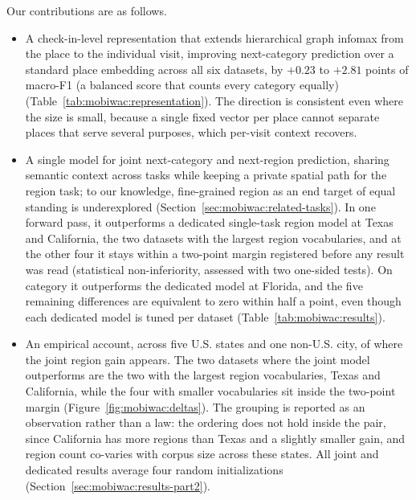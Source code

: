 Our contributions are as follows.
\begin{itemize}
  \item A check-in-level representation that extends hierarchical graph infomax from the place to the individual visit, improving next-category prediction over a standard place embedding across all six datasets, by $+0.23$ to $+2.81$ points of macro-F1 (a balanced score that counts every
    category equally) (Table~\ref{tab:mobiwac:representation}). The direction is
    consistent even where the size is small, because a single fixed vector
    per place cannot separate places that serve several purposes, which
    per-visit context recovers.
  \item A single model for joint next-category and next-region prediction, sharing semantic context across tasks while keeping a private spatial path for the region task; to our knowledge, fine-grained region as an end target of equal standing is underexplored (Section~\ref{sec:mobiwac:related-tasks}). In one forward pass, it outperforms a dedicated
    single-task region model at Texas and California, the two datasets with the
    largest region vocabularies, and at the other four it stays within a
    two-point margin registered before any result was read (statistical
    non-inferiority, assessed with two one-sided tests). On category it
    outperforms the dedicated model at Florida, and the five remaining
    differences are equivalent to zero within half a point, even though each
    dedicated model is tuned per dataset (Table~\ref{tab:mobiwac:results}).
  \item An empirical account, across five U.S. states and one non-U.S. city, of where the joint
    region gain appears. The two datasets where the joint model outperforms are the two with the
    largest region vocabularies, Texas and California, while the four with smaller vocabularies sit
    inside the two-point margin (Figure~\ref{fig:mobiwac:deltas}). The grouping is reported as an
    observation rather than a law: the ordering does not hold inside the pair, since California has
    more regions than Texas and a slightly smaller gain, and region count co-varies with corpus
    size across these states. All joint and dedicated results average
    four random initializations (Section~\ref{sec:mobiwac:results-part2}).
\end{itemize}

